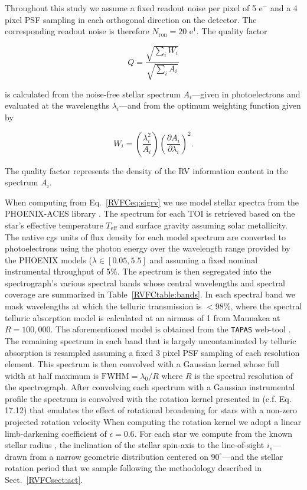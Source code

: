 \noindent Throughout this study we assume
  a fixed readout noise per pixel of 5 e$^-$ and a 4 pixel PSF sampling in
  each orthogonal direction on the detector. The corresponding readout noise is therefore  
  $N_{\text{ron}} = 20$ e$^1$. The quality factor

\begin{equation}
  Q = \frac{\sqrt{\sum_i{W_i}}}{\sqrt{\sum_i{A_i}}}
\end{equation}

\noindent is calculated from the noise-free stellar spectrum $A_i$---given in photoelectrons
and evaluated at the wavelengths $\lambda_i$---and from the optimum weighting function given
by

\begin{equation}
  W_i = \left( \frac{\lambda_i^2}{A_i} \right) \left( \frac{\partial A_i}{\partial \lambda_i} \right)^2.
\end{equation}

\noindent The quality factor represents the density of the RV information content in the spectrum
$A_i$.

When computing \sigRV{} from Eq.~\ref{RVFCeq:sigrv}
we use model stellar spectra from the PHOENIX-ACES library \citep{husser13}.
The spectrum for each TOI is retrieved based on the star's effective temperature $T_{\text{eff}}$ and 
surface gravity 
assuming solar metallicity. The native cgs units of flux density for each model spectrum
are converted to photoelectrons using the photon energy over the wavelength range provided by the
PHOENIX models ($\lambda \in [0.05,5.5]$ \micron{)} and assuming a fixed nominal
instrumental throughput of 5\%.
The spectrum is then segregated into the spectrograph's various spectral bands whose central wavelengths
and spectral coverage are summarized in Table~\ref{RVFCtable:bands}. In each spectral band we mask
wavelengths at which the telluric transmission is $< 98$\%, where the
spectral telluric absorption model is calculated at an airmass of 1 from Maunakea at $R=100,000$.
The aforementioned model is obtained from the \texttt{TAPAS} web-tool \citep{bertaux14}.
The remaining spectrum in each band that is largely uncontaminated by telluric absorption
is resampled assuming a fixed 3 pixel PSF sampling of each resolution element.
This spectrum is then convolved with a Gaussian kernel whose full width at half maximum is
$\text{FWHM} = \lambda_0 / R$ where $R$ is the spectral resolution of the spectrograph.
After convolving each spectrum with a Gaussian instrumental profile
the spectrum is convolved with the rotation kernel presented in \cite{gray08}
(c.f. Eq. 17.12) that emulates
the effect of rotational broadening for stars with a non-zero projected rotation velocity 
When computing the rotation kernel we adopt a linear limb-darkening coefficient of $\epsilon=0.6$.
For each star we compute \vsini{} from the known stellar radius , the
inclination of the stellar spin-axis to the line-of-sight $i_s$---drawn from a narrow geometric
distribution centered on $90^{\circ}$---and the stellar rotation period \prot{,} 
that we sample following the methodology described in Sect.~\ref{RVFCsect:act}.

